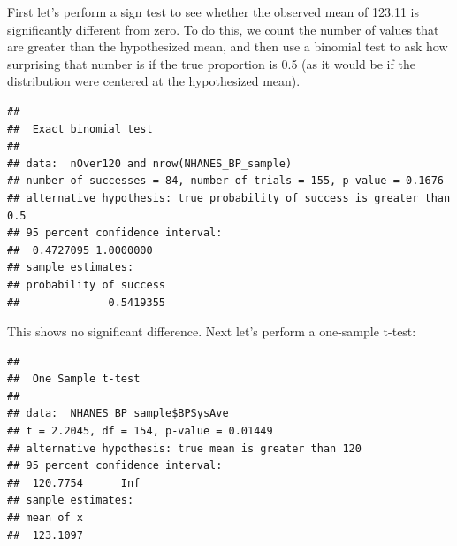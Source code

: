 \documentclass[12pt,]{book}
\newenvironment{Shaded}{\begin{snugshade}}{\end{snugshade}}
\newcommand{\DataTypeTok}[1]{\textcolor[rgb]{0.13,0.29,0.53}{#1}}
\newcommand{\DecValTok}[1]{\textcolor[rgb]{0.00,0.00,0.81}{#1}}
\newcommand{\KeywordTok}[1]{\textcolor[rgb]{0.13,0.29,0.53}{\textbf{#1}}}
\newcommand{\NormalTok}[1]{#1}
\newcommand{\OperatorTok}[1]{\textcolor[rgb]{0.81,0.36,0.00}{\textbf{#1}}}
\newcommand{\StringTok}[1]{\textcolor[rgb]{0.31,0.60,0.02}{#1}}
\begin{document}
First let's perform a sign test to see whether the observed mean of 123.11 is significantly different from zero. To do this, we count the number of values that are greater than the hypothesized mean, and then use a binomial test to ask how surprising that number is if the true proportion is 0.5 (as it would be if the distribution were centered at the hypothesized mean).

\begin{Shaded}
\end{Shaded}

\begin{verbatim}
## 
##  Exact binomial test
## 
## data:  nOver120 and nrow(NHANES_BP_sample)
## number of successes = 84, number of trials = 155, p-value = 0.1676
## alternative hypothesis: true probability of success is greater than 0.5
## 95 percent confidence interval:
##  0.4727095 1.0000000
## sample estimates:
## probability of success 
##              0.5419355
\end{verbatim}

This shows no significant difference. Next let's perform a one-sample t-test:

\begin{Shaded}
\end{Shaded}

\begin{verbatim}
## 
##  One Sample t-test
## 
## data:  NHANES_BP_sample$BPSysAve
## t = 2.2045, df = 154, p-value = 0.01449
## alternative hypothesis: true mean is greater than 120
## 95 percent confidence interval:
##  120.7754      Inf
## sample estimates:
## mean of x 
##  123.1097
\end{verbatim}
\end{document}
